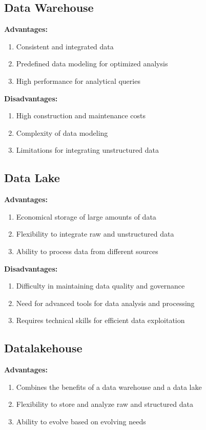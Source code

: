 
\subsection{Data Warehouse}
\textbf{Advantages:}
\begin{enumerate}
\item Consistent and integrated data
\item Predefined data modeling for optimized analysis
\item High performance for analytical queries
\end{enumerate}

\textbf{Disadvantages:}
\begin{enumerate}
\item High construction and maintenance costs
\item Complexity of data modeling
\item Limitations for integrating unstructured data
\end{enumerate}

\subsection{Data Lake}
\textbf{Advantages:}
\begin{enumerate}
\item Economical storage of large amounts of data
\item Flexibility to integrate raw and unstructured data
\item Ability to process data from different sources
\end{enumerate}

\textbf{Disadvantages:}
\begin{enumerate}
\item Difficulty in maintaining data quality and governance
\item Need for advanced tools for data analysis and processing
\item Requires technical skills for efficient data exploitation
\end{enumerate}

\subsection{Datalakehouse}
\textbf{Advantages:}
\begin{enumerate}
\item Combines the benefits of a data warehouse and a data lake
\item Flexibility to store and analyze raw and structured data
\item Ability to evolve based on evolving needs
\end{enumerate}

